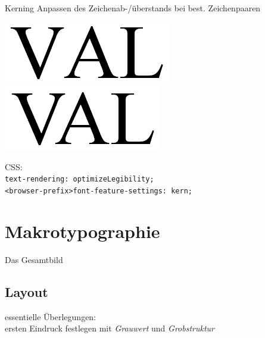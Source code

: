 \documentclass[ngerman,draft, usepdftitle=true]{beamer}
\newcommand*{\code}[1]{\texttt{#1}}
\begin{document}
\begin{frame}{Kerning}
Anpassen des Zeichenab-/überstands bei best. Zeichenpaaren
\begin{center}
  \includegraphics[height=.2\paperheight]{Kerning_without.png}
  \hfill
  \includegraphics[height=.2\paperheight]{Kerning_with.png}
\end{center}
\vfill
CSS:\\ 
\code{text-rendering: optimizeLegibility; \\
  <browser-prefix>font-feature-settings: kern;}
\end{frame}


\section{Makrotypographie}
\begin{frame}
  \sectionpage

  \centering
  Das Gesamtbild
\end{frame}

\subsection{Layout}
\begin{frame}
  \subsectionpage
  \centering
  essentielle Überlegungen: \\
  ersten Eindruck festlegen 
  mit \emph{Grauwert} und \emph{Grobstruktur}
\end{frame}
\end{document}

